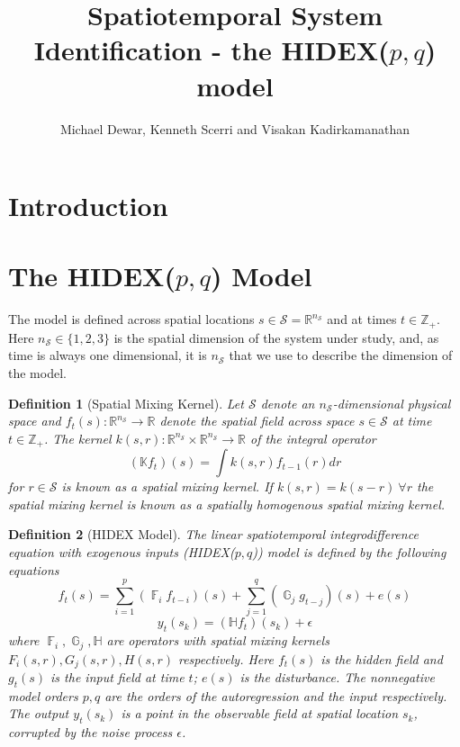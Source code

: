 \documentclass{IEEEtran}
\title{Spatiotemporal System Identification - the HIDEX($p,q$) model}
\author{Michael Dewar, Kenneth Scerri and Visakan Kadirkamanathan}
\DeclareMathOperator{\F}{\mathbb{F}}
\DeclareMathOperator{\G}{\mathbb{G}}
\DeclareMathOperator{\onto}{\rightarrow}
\newtheorem{definition}{Definition}
\begin{document}
\maketitle

\section{Introduction}

\section{The HIDEX($p,q$) Model}
\label{sec:model}

The model is defined across spatial locations $s \in \mathcal{S} = \mathbb{R}^{n_\mathcal{S}}$ and at times $t \in \mathbb{Z}_+$. Here $n_\mathcal{S} \in \{1,2,3\}$ is the spatial dimension of the system under study, and, as time is always one dimensional, it is $n_\mathcal{S}$ that we use to describe the dimension of the model. 

\begin{definition}[Spatial Mixing Kernel]
	Let $\mathcal{S}$ denote an $n_\mathcal{S}$-dimensional physical space and $f_t(s): \mathbb{R}^{n_\mathcal{S}} \onto \mathbb{R}$ denote the spatial field across space $s \in \mathcal{S}$ at time $t \in \mathbb{Z}_+$. The kernel $k(s,r): \mathbb{R}^{n_\mathcal{S}} \times \mathbb{R}^{n_\mathcal{S}} \onto \mathbb{R}$ of the integral operator
	\begin{equation}
		(\mathbb{K}f_t)(s) = \int k(s,r) f_{t-1}(r) dr
	\end{equation}
	for $r \in \mathcal{S}$ is known as a \emph{spatial mixing kernel}. If $k(s,r) = k(s-r) ~ \forall r$ the spatial mixing kernel is known as a \emph{spatially homogenous spatial mixing kernel}.
\end{definition}

\begin{definition}[HIDEX Model]
	\label{def:hidex}
	The linear spatiotemporal integrodifference equation with exogenous inputs (HIDEX($p,q$)) model is defined by the following equations
	\begin{equation}
		\label{eqn:hidex-hidden}
	f_t(s)= \sum_{i=1}^{p} (\F_i f_{t-i})(s) + \sum_{j=1}^{q}(\G_j g_{t-j})(s)+e(s)
	\end{equation}
	\begin{equation}
	\label{eqn:hidex-obs}
	y_t(s_k) = (\mathbb{H}f_t)(s_k) + \epsilon
	\end{equation}
	where $\F_i,\G_j,\mathbb{H}$ are operators with spatial mixing kernels $F_i(s,r), G_j(s,r), H(s,r)$ respectively. Here $f_t(s)$ is the hidden field and $g_{t}(s)$ is the input field at time $t$; $e(s)$ is the disturbance. The nonnegative model orders $p,q$ are the orders of the autoregression and the input respectively. The output $y_t(s_k)$ is a point in the observable field at spatial location $s_k$, corrupted by the noise process $\epsilon$.
\end{definition}
\end{document}
